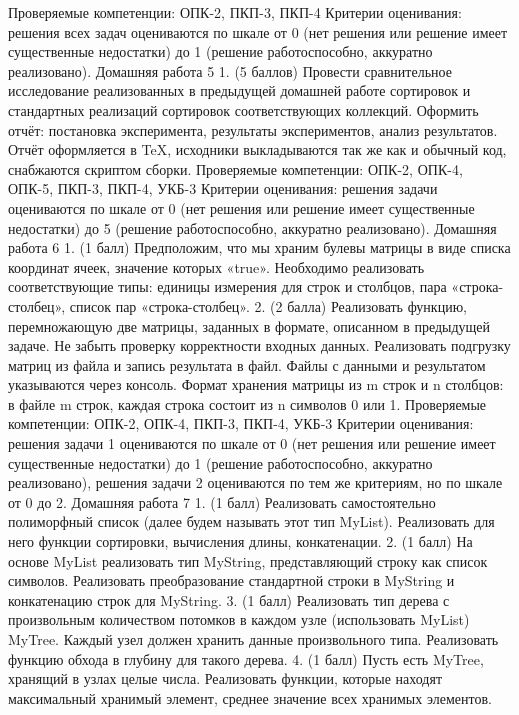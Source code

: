 Проверяемые компетенции: ОПК-2, ПКП-3, ПКП-4
Критерии оценивания: решения всех задач оцениваются по шкале от 0 (нет решения или решение имеет существенные недостатки) до 1 (решение работоспособно, аккуратно реализовано). 
Домашняя работа 5
    1. (5 баллов) Провести сравнительное исследование реализованных в предыдущей домашней работе сортировок и стандартных реализаций сортировок соответствующих коллекций. Оформить отчёт: постановка эксперимента, результаты экспериментов, анализ результатов. Отчёт оформляется в TeX, исходники выкладываются так же как и обычный код, снабжаются скриптом сборки.
Проверяемые компетенции: ОПК-2, ОПК-4, ОПК-5, ПКП-3, ПКП-4, УКБ-3
Критерии оценивания: решения задачи оцениваются по шкале от 0 (нет решения или решение имеет существенные недостатки) до 5 (решение работоспособно, аккуратно реализовано). 
Домашняя работа 6
    1. (1 балл) Предположим, что мы храним булевы матрицы в виде списка координат ячеек, значение которых «true». Необходимо реализовать соответствующие типы: единицы измерения для строк и столбцов, пара «строка-столбец», список пар «строка-столбец». 
    2. (2 балла) Реализовать функцию, перемножающую две матрицы, заданных в формате, описанном в предыдущей задаче. Не забыть проверку корректности входных данных. Реализовать подгрузку матриц из файла и запись результата в файл. Файлы с данными и результатом указываются через консоль. Формат хранения матрицы из m строк и n столбцов: в файле m строк, каждая строка состоит из n символов 0 или 1. 
Проверяемые компетенции: ОПК-2, ОПК-4, ПКП-3, ПКП-4, УКБ-3
Критерии оценивания: решения задачи 1 оцениваются по шкале от 0 (нет решения или решение имеет существенные недостатки) до 1 (решение работоспособно, аккуратно реализовано), решения задачи 2 оцениваются по тем же критериям, но по шкале от 0 до 2.
Домашняя работа 7 
    1. (1 балл) Реализовать самостоятельно полиморфный список (далее будем называть этот тип MyList). Реализовать для него функции сортировки, вычисления длины, конкатенации.
    2. (1 балл) На основе MyList реализовать тип MyString, представляющий строку как список символов. Реализовать преобразование стандартной строки в MyString и конкатенацию строк для  MyString.
    3. (1 балл) Реализовать тип дерева с произвольным количеством потомков в каждом узле (использовать MyList) MyTree. Каждый узел должен хранить данные произвольного типа. Реализовать функцию обхода в глубину для такого дерева.
    4. (1 балл) Пусть есть MyTree, хранящий в узлах целые числа. Реализовать функции, которые находят максимальный хранимый элемент, среднее значение всех хранимых элементов.
